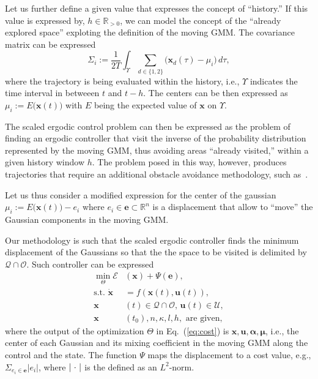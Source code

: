 \documentclass[letterpaper,10pt,conference,twoside]{IEEEtran}
\theoremstyle{definition}
\begin{document}
Let us further define a given value that expresses the concept of ``history.'' If this value is expressed by, $h\in\mathbb{R}_{>0}$, we can model the concept of the ``already explored space'' exploting the definition of the moving GMM. The covariance matrix can be expressed
\begin{equation}
  \Sigma_i:=\frac{1}{2T}\int_\Upsilon\sum_{d\in\{1,2\}}{\big(\mathbf{x}_d(\tau)-\mu_i\big)}\,d\tau,
\end{equation}
where the trajectory is being evaluated within the history, i.e., $\Upsilon$ indicates the time interval in betweeen $t$ and $t-h$.
%
The centers can be then expressed as $\mu_i:=E\big(\mathbf{x}(t)\big)$ with $E$ being the expected value of $\mathbf{x}$ on $\Upsilon$. 

The scaled ergodic control problem can then be expressed as the problem of finding an ergodic controller that visit the inverse of the probability distribution represented by the moving GMM, thus avoiding areas ``already visited,'' within a given history window $h$. The problem posed in this way, however, produces trajectories that require an additional obstacle avoidance methodology, such as~\cite{lerch2023safety}.

Let us thus consider a modified expression for the center of the gaussian $\mu_i:=E\big(\mathbf{x}(t)\big)-e_i$ where $e_i\in\mathbf{e}\subset\mathbb{R}^n$ is a displacement that allow to ``move'' the Gaussian components in the moving GMM. 

Our methodology is such that the scaled ergodic controller finds the minimum displacement of the Gaussians so that the the space to be visited is delimited by $\mathcal{Q}\cap\mathcal{O}$. Such controller can be expressed
\begin{subequations}\begin{align}
  \min_{\Theta}%
  \mathcal{E}&(\mathbf{x})+\Psi(\mathbf{e}),\label{eq:cost}\\
  \text{s.t. }\dot{\mathbf{x}}&=f(\mathbf{x}(t),\mathbf{u}(t)),\label{eq:dyn}\\
  \mathbf{x}&(t)\in\mathcal{Q}\cap\mathcal{O},\,\mathbf{u}(t)\in\mathcal{U},\\
  \mathbf{x}&(t_0),n,\kappa,l,h,\text{ are given},\label{eq:ocpconsttotf}
\end{align}\end{subequations}
where the output of the optimization $\Theta$ in Eq.~(\ref{eq:cost}) is $\mathbf{x},\mathbf{u},\boldsymbol{\alpha},\boldsymbol{\mu}$, i.e., the center of each Gaussian and its mixing coefficient in the moving GMM along the control and the state. The function $\Psi$ maps the displacement to a cost value, e.g., $\Sigma_{e_i\in\mathbf{e}}|e_i|$, where $|\hspace{.2ex}\cdot\hspace{.2ex}|$ is the defined as an $L^2$-norm.
\end{document}
